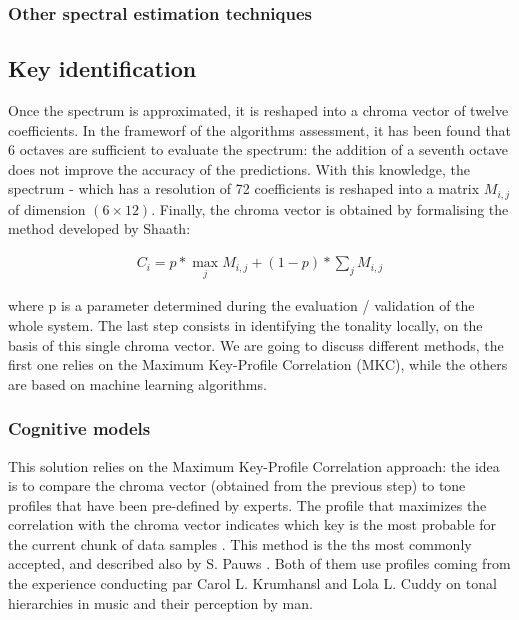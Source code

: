 \documentclass[letterpaper]{article}
\begin{document}
\subsubsection{Other spectral estimation techniques}

\citep{MA}

\subsection{Key identification}

Once the spectrum is approximated, it is reshaped into a chroma vector of twelve coefficients. In the frameworf of the algorithms assessment, it has been found that 6 octaves are sufficient to evaluate the spectrum: the addition of a seventh octave does not improve the accuracy of the predictions. With this knowledge, the spectrum - which has a resolution of 72 coefficients is reshaped into a matrix $M_{i, j}$ of dimension $(6 \times 12)$. Finally, the chroma vector is obtained by formalising the method developed by Sha\textquotesingle ath:

\begin{align}
C_{i} = p * \max_{j} M_{i, j} + (1 - p) * \sum_{j} M_{i, j}
\label{chroma}
\end{align}

where p is a parameter determined during the evaluation / validation of the whole system.
The last step consists in identifying the tonality locally,
on the basis of this single chroma vector. We are going to discuss different methods, the first one relies on the Maximum Key-Profile Correlation (MKC),
while the others are based on machine learning algorithms.

\subsubsection{Cognitive models}

This solution relies on the Maximum Key-Profile Correlation approach: the idea is to compare the chroma vector (obtained from the previous step) to
tone profiles that have been pre-defined by experts. The profile that maximizes the correlation with the chroma vector indicates which key is the most probable
for the current chunk of data samples \citep{AT}. This method is the ths most commonly accepted, and described also by S. Pauws \citep{SP}. Both of them use profiles coming from the experience conducting par Carol L. Krumhansl and Lola L. Cuddy on tonal hierarchies in music and their perception by man.\\
\end{document}

